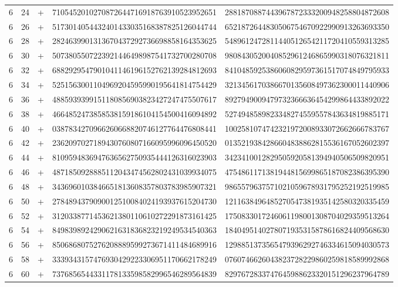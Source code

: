 \begin{longtable}{rrrll}
6 & 24 & + & 7105452010270872644716918763910523952651 & 2881870887443967872333200948258804872608 \\
6 & 26 & + & 5173014054432401433035168387825126044744 & 6521872644830506754670922990913263693350 \\
6 & 28 & + & 2824639901313670437292736698858164353625 & 5489612472811440512654211720410559313285 \\
6 & 30 & + & 5073805507223921446498987541732700280708 & 9808430520040852961246865990318076321811 \\
6 & 32 & + & 6882929547901041146196152762139284812693 & 8410485925386060829597361517074849795933 \\
6 & 34 & + & 5251563001104969204595990195641814754429 & 3213456170386670135608497362300011440906 \\
6 & 36 & + & 4885939399151180856903823427247475507617 & 8927949009479732366636454299864433892022 \\
6 & 38 & + & 4664852473858538159186104154500416094892 & 5274948589823348274559557843634819885171 \\
6 & 40 & + & 0387834270966260668820746127764476808441 & 1002581074742321972008933072662666783767 \\
6 & 42 & + & 2362097027189430760807166095996096450520 & 0135219384286604838862815536167052602397 \\
6 & 44 & + & 8109594836947636562750935444126316023903 & 3423410012829505920581394940506509820951 \\
6 & 46 & + & 4871850928885112043474562802431039934075 & 4754861171381944815699865187082386395390 \\
6 & 48 & + & 3436960103846651813608357803783985907321 & 9865579637571021059678931795252192519985 \\
6 & 50 & + & 2784894379090012510084024193937615204730 & 1211638496485270547381935142580320335459 \\
6 & 52 & + & 3120338771453621380110610272291873161425 & 1750833017246061198001308704029359513264 \\
6 & 54 & + & 8498398924290621631836823219249534540363 & 1840495140278071935315878616824409568630 \\
6 & 56 & + & 8506868075276208889599273671411484689916 & 1298851373565479396292746334615094030573 \\
6 & 58 & + & 3339343157476930429223306951170662178249 & 0760746626043823728229860259818589992868 \\
6 & 60 & + & 7376856544331178133598582996546289564839 & 8297672833747645988623320151296237964789 \\

\end{longtable}
